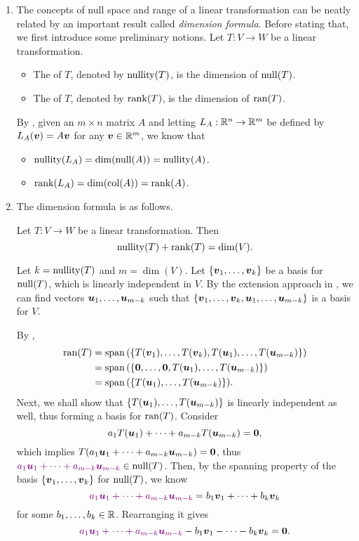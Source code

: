 \begin{enumerate}
\item The concepts of null space and range of a linear transformation can be
neatly related by an important result called \emph{dimension formula}. Before
stating that, we first introduce some preliminary notions. Let \(T:V\to W\) be
a linear transformation.
\begin{itemize}
\item The  of \(T\), denoted by \(\operatorname{nullity}(T)\), is the dimension
of \(\operatorname{null}(T)\).
\item The  of \(T\), denoted by \(\operatorname{rank}(T)\), is the dimension of
\(\operatorname{ran}(T)\).
\end{itemize}
By , given an \(m\times n\) matrix \(A\)
and letting \(L_A:\mathbb{R}^n\to\mathbb{R}^m\) be defined by \(L_A(\vb*{v})=A\vb*{v}\) for
any \(\vb*{v}\in\mathbb{R}^m\), we know that
\begin{itemize}
\item \(\operatorname{nullity}(L_A)=\dim(\operatorname{null}(A))=\operatorname{nullity}(A)\).
\item \(\operatorname{rank}(L_A)=\dim(\operatorname{col}(A))=\operatorname{rank}(A)\).
\end{itemize}

\item The dimension formula is as follows.

\begin{theorem}
\label{thm:dim-fmla}
Let \(T:V\to W\) be a linear transformation. Then
\[
\operatorname{nullity}(T)+\operatorname{rank}(T)=\dim(V).
\]
\end{theorem}
\begin{pf}
Let \(k=\operatorname{nullity}(T)\) and \(m=\dim(V)\). Let \(\{\vb*{v}_1,\dotsc,\vb*{v}_k\}\)
be a basis for \(\operatorname{null}(T)\), which is linearly independent in \(V\). By the
extension approach in , we can find vectors
\(\vb*{u}_1,\dotsc,\vb*{u}_{m-k}\) such that
\(\{\vb*{v}_1,\dotsc,\vb*{v}_k,\vb*{u}_1,\dotsc,\vb*{u}_{m-k}\}\) is a
basis for \(V\).

By ,
\begin{align*}
\operatorname{ran}(T)&=\operatorname{span}\qty(\{T(\vb*{v}_1),\dotsc,T(\vb*{v}_k),T(\vb*{u}_1),\dotsc,T(\vb*{u}_{m-k})\}) \\
&=\operatorname{span}\qty(\{\vb*{0},\dotsc,\vb*{0},T(\vb*{u}_1),\dotsc,T(\vb*{u}_{m-k})\}) \\
&=\operatorname{span}\qty(\{T(\vb*{u}_1),\dotsc,T(\vb*{u}_{m-k})\}).
\end{align*}
Next, we shall show that \(\{T(\vb*{u}_1),\dotsc,T(\vb*{u}_{m-k})\}\) is
linearly independent as well, thus forming a basis for \(\operatorname{ran}(T)\). Consider
\[
a_1T(\vb*{u}_1)+\dotsb+a_{m-k}T(\vb*{u}_{m-k})=\vb*{0},
\]
which implies \(T(a_1\vb*{u}_1+\dotsb+a_{m-k}\vb*{u}_{m-k})=\vb*{0}\), thus
\({\color{violet}a_1\vb*{u}_1+\dotsb+a_{m-k}\vb*{u}_{m-k}}\in\operatorname{null}(T)\). Then, by the spanning
property of the basis \(\{\vb*{v}_1,\dotsc,\vb*{v}_k\}\) for \(\operatorname{null}(T)\), we
know
\[
{\color{violet}a_1\vb*{u}_1+\dotsb+a_{m-k}\vb*{u}_{m-k}}=b_1\vb*{v}_1+\dotsb+b_k\vb*{v}_k
\]
for some \(b_1,\dotsc,b_k\in\mathbb{R}\). Rearranging it gives
\[
{\color{violet}a_1\vb*{u}_1+\dotsb+a_{m-k}\vb*{u}_{m-k}}-b_1\vb*{v}_1-\dotsb-b_k\vb*{v}_k=\vb*{0}.
\]


\end{pf}
\end{enumerate}
